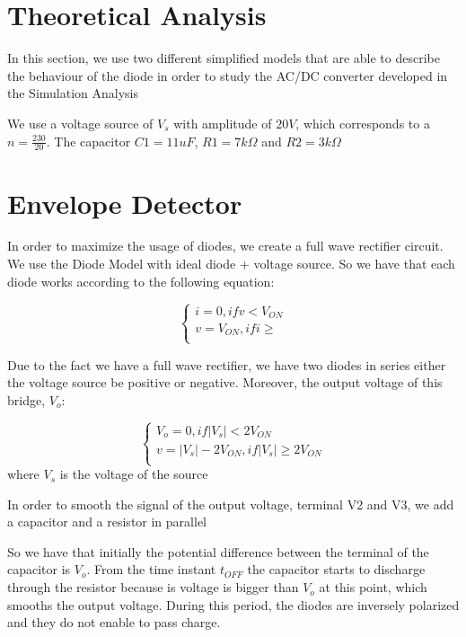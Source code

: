 \section{Theoretical Analysis}
\label{sec:analysis}

In this section, we use two different simplified models that are able to describe the behaviour of the diode
in order to study the AC/DC converter developed in the Simulation Analysis

We use a voltage source of $V_s$ with amplitude of $20 V$, which corresponds to a $n = \frac{230}{20}$.
The capacitor $C1 = 11uF$, $R1 = 7k\Omega$ and $R2 = 3k\Omega$


\section{Envelope Detector}

In order to maximize the usage of diodes, we create a full wave rectifier circuit. We use the Diode Model with ideal diode + voltage source.
So we have that each diode works according to the following equation:


\[
  \left\{
  \begin{array}{ll}
    i = 0, if v < V_{ON}   \\
    v = V_{ON}, if  i \geq \\
  \end{array}
  \right.
\]

Due to the fact we have a full wave rectifier, we have two diodes in series either the voltage source be positive or negative.
Moreover, the output voltage of this bridge, $V_o$:

\[
  \left\{
  \begin{array}{ll}
    V_o = 0,  if  |V_s| < 2V_{ON}               \\
    v = |V_s| - 2 V_{ON}, if |V_s| \geq 2V_{ON} \\
  \end{array}
  \right.
\] where $V_s$ is the voltage of the source

In order to smooth the signal of the output voltage, terminal V2 and V3, we add a capacitor and a resistor in parallel

So we have that initially the potential difference between the terminal of the capacitor is $V_o$. From the time instant $t_{OFF}$
the capacitor starts to discharge through the resistor because is voltage is bigger than $V_o$ at this point, which smooths the output voltage.
During this period, the diodes are inversely polarized and they do not enable to pass charge.

